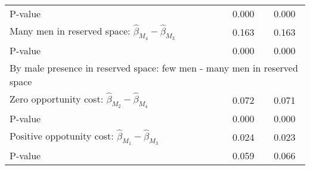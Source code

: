 \begin{tabular}{l*{2}{c}}
\quad P-value       &       0.000         &       0.000         \\
\quad Many men in reserved space: $\hat\beta_{M_4} - \hat\beta_{M_3}$ &       0.163         &       0.163         \\
\quad P-value       &       0.000         &       0.000         \\
\multicolumn{3}{l}{By male presence in reserved space: few men - many men in reserved space} \\ \quad Zero opportunity cost: $\hat\beta_{M_2} - \hat\beta_{M_4}$&       0.072         &       0.071         \\
\quad P-value       &       0.000         &       0.000         \\
\quad Positive oppotunity cost: $\hat\beta_{M_1} - \hat\beta_{M_3}$ &       0.024         &       0.023         \\
\quad P-value       &       0.059         &       0.066         \\
\hline\hline \end{tabular}
